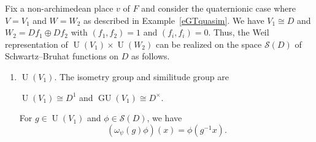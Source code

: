 \documentclass[11pt]{article}
\theoremstyle{plain}
\theoremstyle{remark}
\theoremstyle{definition}
\DeclareMathOperator{\U}{U}
\DeclareMathOperator{\GU}{GU}
\begin{document}
Fix a non-archimedean place $v$ of $F$ and consider the quaternionic case where $V=V_1$ and $W=W_2$ as described in Example~\ref{eGTquasim}.
We have $V_1\cong D$ and $W_2=D f_1\oplus D f_2$ with $(f_1,f_2)=1$ and $(f_i,f_i)=0$.
Thus, the Weil representation of $\U(V_1)\times \U(W_2)$ can be realized on the space $\mathcal{S}(D)$ of Schwartz--Bruhat functions on $D$ as follows.
\begin{enumerate}
    \item \underline{$\U(V_1)$}.
    The isometry group and similitude group are
    \begin{center}
        $\U(V_1)\cong D^1$ and $\GU(V_1)\cong D^{\times}$.
    \end{center}
    For $g\in \U(V_1)$ and $\phi\in \mathcal{S}(D)$, we have
    \[
        (\omega_{\psi}(g)\phi)(x)=\phi(g^{-1}x).
    \]


\end{enumerate}
\end{document}
